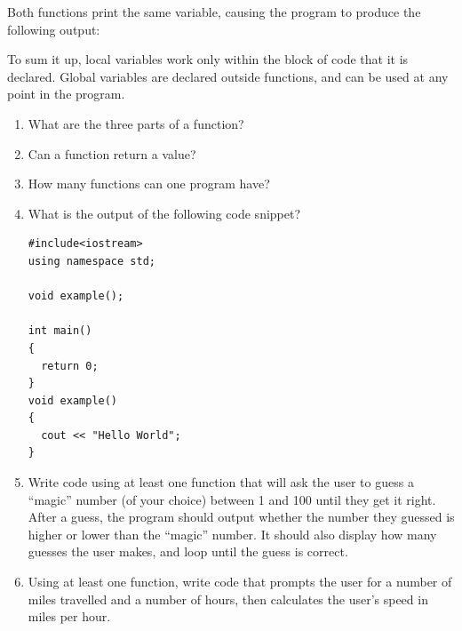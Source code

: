 Both functions print the same variable, causing the program to produce the following output: 

\noindent{}

\noindent{}

To sum it up, local variables work only within the block of code that it is declared. 
Global variables are declared outside functions, and can be used at any point in the program.



\begin{enumerate}
	\item What are the three parts of a function?
	\item Can a  function return a value?
	\item How many functions can one program have?
	\item What is the output of the following code snippet? \nopagebreak[4]

\noindent\begin{minipage}{\linewidth}\begin{lstlisting}
#include<iostream>
using namespace std;

void example();

int main()
{
  return 0;
}
void example()
{
  cout << "Hello World";  
}
\end{lstlisting}\end{minipage}

	\item Write code using at least one function that will ask the user to guess a ``magic'' number (of your choice) between 1 and 100 until they get it right. After a guess, the program should output whether the number they guessed is higher or lower than the ``magic'' number. It should also display how many guesses the user makes, and loop until the guess is correct.

  \item Using at least one function, write code that prompts the user for a number of miles travelled and a number of hours, then calculates the user's speed in miles per hour.

\end{enumerate}



